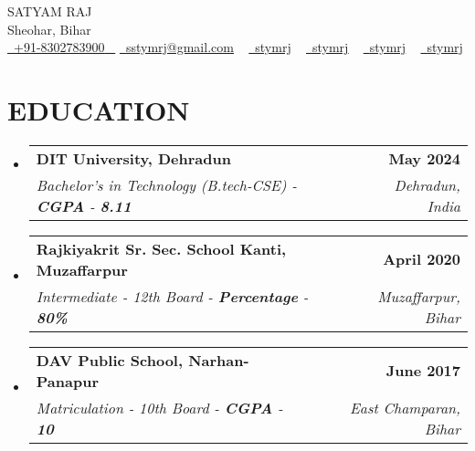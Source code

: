 \documentclass[letterpaper,11pt]{article}
\makeatletter
\newcommand{\resumeSubheading}[4]{
  \vspace{-2pt}\item
    \begin{tabular*}{1.0\textwidth}[t]{l@{\extracolsep{\fill}}r}
      \textbf{\large#1} & \textbf{\small #2} \\
      \textit{\large#3} & \textit{\small #4} \\
     
    \end{tabular*}\vspace{-7pt}
}
\newcommand{\resumeSubHeadingListStart}{\begin{itemize}[leftmargin=0.0in, label={}]}
\newcommand{\resumeSubHeadingListEnd}{\end{itemize}}
\makeatother
\begin{document}




\begin{center}
    {\Huge \scshape SATYAM RAJ} \\ \vspace{1pt}
    Sheohar, Bihar \\ \vspace{1pt}
    \small \href{tel:+xxxxxxxxxxxx}{ \raisebox{-0.1\height}\faPhone\ \underline{+91-8302783900} ~} \href{mailto:sstymrj@gmail.com}{\raisebox{-0.2\height}\faEnvelope\  \underline{sstymrj@gmail.com}} ~
    \href{https://linkedin.com/in/stymrj}{\raisebox{-0.2\height}\faLinkedinSquare\ \underline{stymrj}}  ~
    \href{https://github.com/yourid}{\raisebox{-0.2\height}\faGithub\ \underline{stymrj}} ~
    \href{https://www.hackerrank.com/stymrj}{\raisebox{-0.2\height}\faHackerrank\ \underline{stymrj}} ~
    \href{https://leetcode.com/u/stymrj/}{\raisebox{-0.2\height}\faPoll\ \underline{stymrj}}
    \vspace{-8pt}
\end{center}




\section{EDUCATION}
  \resumeSubHeadingListStart
    \resumeSubheading
      {DIT University, Dehradun}{May 2024}
      {Bachelor's in Technology (B.tech-CSE) - \textbf{CGPA} - \textbf{8.11}}{Dehradun, India}
  \resumeSubHeadingListEnd
 
  \resumeSubHeadingListStart
    \resumeSubheading
      {Rajkiyakrit Sr. Sec. School Kanti, Muzaffarpur }{April 2020}
      {Intermediate - 12th Board  - \textbf{Percentage} - \textbf{80\%}}{Muzaffarpur, Bihar}
  \resumeSubHeadingListEnd


  \resumeSubHeadingListStart
    \resumeSubheading
      {DAV Public School, Narhan-Panapur}{June 2017}
      {Matriculation - 10th Board  - \textbf{CGPA} - \textbf{10}}{East Champaran, Bihar}
  \resumeSubHeadingListEnd


\end{document}
